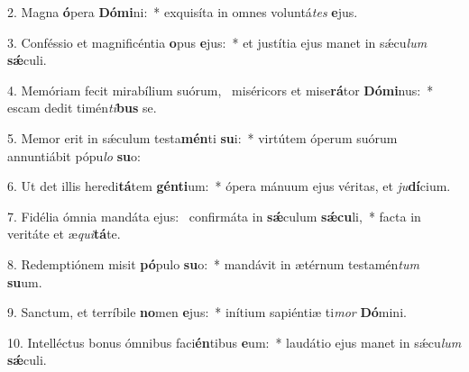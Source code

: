 2. Magna \textbf{ó}pera \textbf{Dó}\textbf{mi}ni:~*  exquisíta in omnes voluntá\textit{tes} \textbf{e}jus.\

3. Conféssio et magnificéntia \textbf{o}pus \textbf{e}jus:~*  et justítia ejus manet in sǽcu\textit{lum} \textbf{sǽ}culi.\

4. Memóriam fecit mirabílium suórum, \dag\  miséricors et mise\textbf{rá}tor \textbf{Dó}\textbf{mi}nus:~*  escam dedit timén\textit{ti}\textbf{bus} se.\

5. Memor erit in sǽculum testa\textbf{mén}ti \textbf{su}i:~*  virtútem óperum suórum annuntiábit pópu\textit{lo} \textbf{su}o:\

6. Ut det illis heredi\textbf{tá}tem \textbf{gén}\textbf{ti}um:~*  ópera mánuum ejus véritas, et \textit{ju}\textbf{dí}cium.\

7. Fidélia ómnia mandáta ejus: \dag\  confirmáta in \textbf{sǽ}culum \textbf{sǽ}\textbf{cu}li,~*  facta in veritáte et æ\textit{qui}\textbf{tá}te.\

8. Redemptiónem misit \textbf{pó}pulo \textbf{su}o:~*  mandávit in ætérnum testamén\textit{tum} \textbf{su}um.\

9. Sanctum, et terríbile \textbf{no}men \textbf{e}jus:~*  inítium sapiéntiæ ti\textit{mor} \textbf{Dó}mini.\

10. Intelléctus bonus ómnibus faci\textbf{én}tibus \textbf{e}um:~*  laudátio ejus manet in sǽcu\textit{lum} \textbf{sǽ}culi.\

